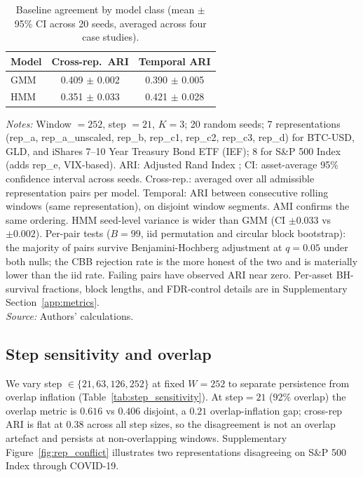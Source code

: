 \documentclass[preprint,12pt,authoryear]{elsarticle}
\newcommand{\SPX}{S\&P 500 Index}
\newcommand{\IEF}{iShares 7--10 Year Treasury Bond ETF (IEF)}
\begin{document}
\begin{table}[!htbp]
\centering
\small
\setlength{\tabcolsep}{5pt}
\caption{Baseline agreement by model class (mean $\pm$ 95\% CI across 20 seeds, averaged across four case studies).}
\label{tab:baseline}
\begin{tabular}{lcc}
\toprule
Model & Cross-rep.\ ARI & Temporal ARI \\
\midrule
GMM & 0.409 $\pm$ 0.002 & 0.390 $\pm$ 0.005 \\
HMM & 0.351 $\pm$ 0.033 & 0.421 $\pm$ 0.028 \\
\bottomrule
\end{tabular}
\par\medskip
\footnotesize
\parbox{\linewidth}{\textit{Notes:} Window $=252$, step $=21$, $K=3$; 20 random seeds; 7 representations (rep\_a, rep\_a\_unscaled, rep\_b, rep\_c1, rep\_c2, rep\_c3, rep\_d) for BTC-USD, GLD, and \IEF{}; 8 for \SPX{} (adds rep\_e, VIX-based). ARI: Adjusted Rand Index \citep{HubertArabie1985}; CI: asset-average 95\% confidence interval across seeds. Cross-rep.: averaged over all admissible representation pairs per model. Temporal: ARI between consecutive rolling windows (same representation), on disjoint window segments. AMI \citep{VinhEppsBailey2010} confirms the same ordering. HMM seed-level variance is wider than GMM (CI $\pm 0.033$ vs $\pm 0.002$). Per-pair tests ($B=99$, iid permutation and circular block bootstrap): the majority of pairs survive Benjamini-Hochberg adjustment at $q=0.05$ under both nulls; the CBB rejection rate is the more honest of the two and is materially lower than the iid rate. Failing pairs have observed ARI near zero. Per-asset BH-survival fractions, block lengths, and FDR-control details are in Supplementary Section~\ref{app:metrics}. \\
\textit{Source:} Authors' calculations.}
\end{table}

\subsection{Step sensitivity and overlap}

We vary step $\in\{21, 63, 126, 252\}$ at fixed $W=252$ to separate persistence from overlap inflation (Table~\ref{tab:step_sensitivity}). At step$=21$ (92\% overlap) the overlap metric is $0.616$ vs $0.406$ disjoint, a $0.21$ overlap-inflation gap; cross-rep ARI is flat at $0.38$ across all step sizes, so the disagreement is not an overlap artefact and persists at non-overlapping windows. Supplementary Figure~\ref{fig:rep_conflict} illustrates two representations disagreeing on \SPX{} through COVID-19.
\end{document}
